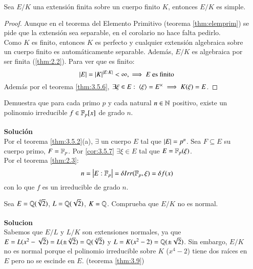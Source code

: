\begin{cor}\label{cor:3.5.7}
    Sea $E/K$ una extensión finita sobre un cuerpo finito $K$, entonces $E/K$ es simple.
\end{cor}
\begin{proof}
    Aunque en el teorema del Elemento Primitivo (teorema \ref{thm:elemprim}) se pide que la extensión sea separable, en el corolario no hace falta pedirlo.\\
    Como $K$ es finito, entonces $K$ es perfecto y cualquier extensión algebraica sobre un cuerpo finito es automáticamente separable. Además, $E/K$ es algebraica por ser finita (\ref{thm:2.2}). Para ver que es finito:
    $$
        \left|E\right| = \left|K\right|^{\left|E:K\right|} < \infty, \implies E \text{ es finito}
    $$
    Además por el teorema \ref{thm:3.5.6}, $\exists \xi \in E:\ \langle\xi\rangle = E^\times \implies K(\xi) = E$.
\end{proof}

\begin{ex}[H3.17]
    Demuestra que para cada primo $p$ y cada natural $n \in \mathbb{N}$ positivo, existe un polinomio irreducible $f \in \mathbb{F}_p[x]$ de grado $n$.\\\\
    \textbf{Solución}\\
    Por el teorema \ref{thm:3.5.2}(a), $\exists$ un cuerpo $E$ tal que $\left|E\right| = p^n$.
    Sea $F \subseteq E$ su cuerpo primo, $F = \mathbb{F}_p$. Por \ref{cor:3.5.7} $\exists \xi \in E$ tal que $E = \mathbb{F}_p(\xi)$.\\
    Por el teorema \ref{thm:2.3}:
    $$
        n = \left|E:\mathbb{F}_p\right| = \delta Irr(\mathbb{F}_p, \xi) = \delta f(x)
    $$
    con lo que $f$ es un irreducible de grado $n$.
\end{ex}

\begin{ex}[H3.9]
    Sea $E = \mathbb{Q}(\sqrt[4]{2})$, $L = \mathbb{Q}(\sqrt 2)$, $K = \mathbb{Q}$. Comprueba que $E/K$ no es normal.\\\\

    \textbf{Solucion}\\
    Sabemos que $E/L$ y $L/K$ son extensiones normales, ya que $E = L(x^2-\sqrt{2}) = L(\pm \sqrt[4]{2}) = \mathbb{Q}(\sqrt[4]{2})$ y $L = K(x^2-2) = \mathbb{Q}(\pm \sqrt{2})$. Sin embargo, $E/K$ no es normal porque el polinomio irreducible sobre $K$ ($x^4-2$) tiene dos raíces en $E$ pero no se escinde en $E$. (teorema \ref{thm:3.9})
\end{ex}

